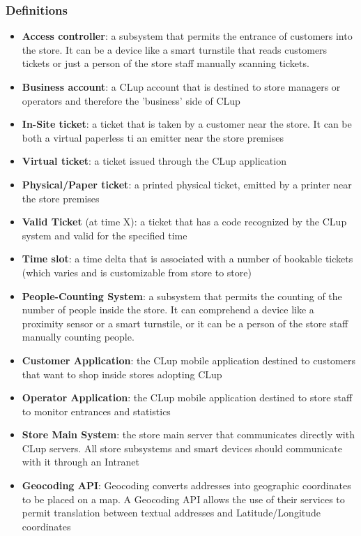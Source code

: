 \vfill
\pagebreak

\subsubsection{Definitions}

\begin{itemize}
    \item \textbf{Access controller}: a subsystem that permits the entrance of customers into the store. It can be a device like a smart turnstile that reads customers tickets or just a person of the store staff manually scanning tickets.
    \item \textbf{Business account}: a CLup account that is destined to store managers or operators and therefore the 'business' side of CLup
    \item \textbf{In-Site ticket}: a ticket that is taken by a customer near the store. It can be both a virtual paperless ti an emitter near the store premises
    \item \textbf{Virtual ticket}: a ticket issued through the CLup application
    \item \textbf{Physical/Paper ticket}: a printed physical ticket, emitted by a printer near the store premises
    \item \textbf{Valid Ticket} (at time X): a ticket that has a code recognized by the CLup system and valid for the specified time
    \item \textbf{Time slot}: a time delta that is associated with a number of bookable tickets (which varies and is customizable from store to store)
    \item \textbf{People-Counting System}: a subsystem that permits the counting of the number of people inside the store. It can comprehend a device like a proximity sensor or a smart turnstile, or it can be a person of the store staff manually counting people.
    \item \textbf{Customer Application}: the CLup mobile application destined to customers that want to shop inside stores adopting CLup
    \item \textbf{Operator Application}: the CLup mobile application destined to store staff to monitor entrances and statistics
    \item \textbf{Store Main System}: the store main server that communicates directly with CLup servers. All store subsystems and smart devices should communicate with it through an Intranet
    \item \textbf{Geocoding API}: Geocoding converts addresses into geographic coordinates to be placed on a map. A Geocoding API allows the use of their services to permit translation between textual addresses and Latitude/Longitude coordinates

\end{itemize}
